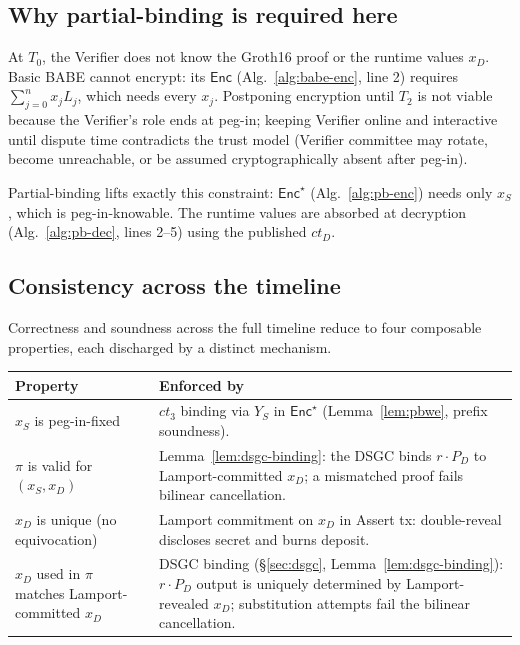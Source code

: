 \documentclass[11pt]{article}
\newcommand{\Enc}{\mathsf{Enc}}
\begin{document}
\subsection{Why partial-binding is required here}

At $T_0$, the Verifier does not know the Groth16 proof or the
runtime values $x_D$. Basic BABE cannot encrypt: its $\Enc$
(Alg.~\ref{alg:babe-enc}, line 2) requires $\sum_{j=0}^{n} x_j L_j$,
which needs every $x_j$. Postponing encryption until $T_2$ is not
viable because the Verifier's role ends at peg-in; keeping Verifier
online and interactive until dispute time contradicts the trust
model (Verifier committee may rotate, become unreachable, or be
assumed cryptographically absent after peg-in).

Partial-binding lifts exactly this constraint: $\Enc^\star$
(Alg.~\ref{alg:pb-enc}) needs only $x_S$, which is peg-in-knowable.
The runtime values are absorbed at decryption
(Alg.~\ref{alg:pb-dec}, lines 2--5) using the published $ct_D$.

\subsection{Consistency across the timeline}

Correctness and soundness across the full timeline reduce to four
composable properties, each discharged by a distinct mechanism.

\begin{center}\small
\renewcommand{\arraystretch}{1.25}
\begin{tabular}{@{}p{3.8cm} p{8cm}@{}}
\toprule
\textbf{Property} & \textbf{Enforced by} \\
\midrule
$x_S$ is peg-in-fixed & $ct_3$ binding via $Y_S$ in $\Enc^\star$
(Lemma~\ref{lem:pbwe}, prefix soundness). \\
$\pi$ is valid for $(x_S, x_D)$ & Lemma~\ref{lem:dsgc-binding}: the
DSGC binds $r \cdot P_D$ to Lamport-committed $x_D$; a mismatched
proof fails bilinear cancellation. \\
$x_D$ is unique (no equivocation) & Lamport commitment on $x_D$ in
Assert tx: double-reveal discloses secret and burns deposit. \\
$x_D$ used in $\pi$ matches Lamport-committed $x_D$ &
DSGC binding (\S\ref{sec:dsgc}, Lemma~\ref{lem:dsgc-binding}):
$r \cdot P_D$ output is uniquely determined by Lamport-revealed
$x_D$; substitution attempts fail the bilinear cancellation. \\
\bottomrule
\end{tabular}
\end{center}
\end{document}
